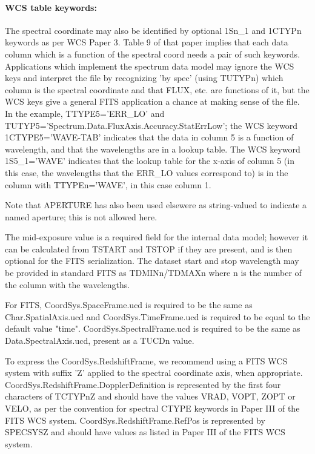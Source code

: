 \paragraph {\bf WCS table keywords:}
The spectral coordinate
may also be identified by optional 1Sn\_1 and 1CTYPn keywords
as per WCS Paper 3. Table 9 of that paper implies that each data column
which is a function of the spectral coord needs a pair of such keywords.
Applications which implement the spectrum data model may ignore the WCS keys and interpret
the file by recognizing 'by spec' (using TUTYPn) 
which column is the spectral coordinate and that
FLUX, etc. are functions of it, but the WCS keys give a general FITS application
a chance at making sense of the file. In the example, TTYPE5='ERR\_LO'
and TUTYP5='Spectrum.Data.FluxAxis.Accuracy.StatErrLow'; the WCS keyword
1CTYPE5='WAVE-TAB' indicates that the data in column 5 is a function
of wavelength, and that the wavelengths are in a lookup table. The WCS
keyword 1S5\_1='WAVE' indicates that the lookup table for the x-axis of
column 5 (in this case, the wavelengths that the ERR\_LO values correspond
to) is in the column with TTYPEn='WAVE', in this case column 1.

Note that APERTURE has also been used elsewere as string-valued
to indicate a named aperture; this is not allowed here.

The mid-exposure value is a required field for the internal data model;
however it can be calculated from TSTART and TSTOP if they are
present, and is then optional for the FITS serialization.
The dataset start and stop wavelength may be provided in
standard FITS as TDMINn/TDMAXn
where n is the number of the column with the wavelengths.

For FITS, CoordSys.SpaceFrame.ucd is required to be the
same as Char.SpatialAxis.ucd and CoordSys.TimeFrame.ucd
is required to be equal to the default value "time".
CoordSys.SpectralFrame.ucd is required to be the same
as Data.SpectralAxis.ucd, present as a TUCDn value.

To express the CoordSys.RedshiftFrame, we recommend using a FITS WCS
system with suffix 'Z' applied to the spectral coordinate axis, when
appropriate. 
CoordSys.RedshiftFrame.DopplerDefinition is represented by the first four characters
of TCTYPnZ and should have the values VRAD, VOPT, ZOPT or VELO,
as per the convention for spectral CTYPE keywords in Paper III of the FITS WCS system.
CoordSys.RedshiftFrame.RefPos is represented by SPECSYSZ and should have values
as listed in Paper III of the FITS WCS system.

